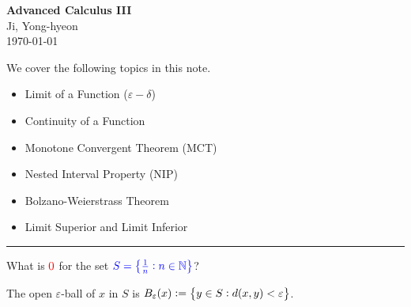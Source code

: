 \documentclass[11pt,openany]{article}
\begin{document}
\begin{center}
	\huge\textbf{Advanced Calculus III}\\
	\vspace{0.5em}
	\large{Ji, Yong-hyeon}\\
	\vspace{0.5em}
	\normalsize{\today}\\
\end{center}

\noindent 
We cover the following topics in this note.
\begin{itemize}
	\item Limit of a Function ($\varepsilon-\delta$)
	\item Continuity of a Function
	\item Monotone Convergent Theorem (MCT)
	\item Nested Interval Property (NIP)
	\item Bolzano-Weierstrass Theorem
	\item Limit Superior and Limit Inferior
\end{itemize}
\hrule\vspace{12pt}
What is $\textcolor{red}{0}$ for the set $\textcolor{blue}{S=\set{\frac{1}{n}:n\in\mathbb{N}}}$?
\begin{center}
\end{center}
\begin{note}
	The open $\varepsilon$-ball of $x$ in $S$ is $B_\varepsilon(x):=\set{y\in S:d(x,y)<\varepsilon}$.
\end{note}
\end{document}
